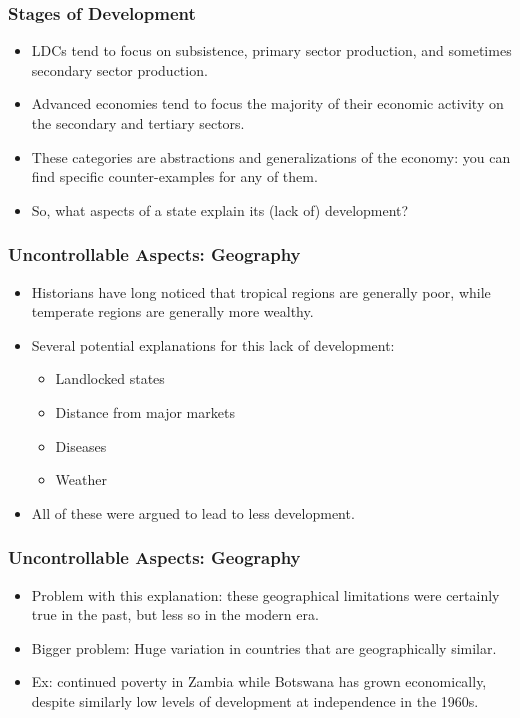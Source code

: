 \documentclass{beamer}
\begin{document}
\begin{frame} 
	\frametitle{\LARGE{Stages of Development}}
	\begin{itemize}
		\item LDCs tend to focus on subsistence, primary sector production, and sometimes secondary sector production. \pause
		\item Advanced economies tend to focus the majority of their economic activity on the secondary and tertiary sectors. \pause
		\item These categories are abstractions and generalizations of the economy: you can find specific counter-examples for any of them.
		\item So, what aspects of a state explain its (lack of) development?
	\end{itemize}
\end{frame}

\begin{frame} 
\frametitle{\LARGE{Uncontrollable Aspects: Geography}}
\begin{itemize}
		\item Historians have long noticed that tropical regions are generally poor, while temperate regions are generally more wealthy. \pause
		\item Several potential explanations for this lack of development:
		\begin{itemize}
			\item Landlocked states \pause
			\item Distance from major markets \pause
			\item Diseases \pause
			\item Weather \pause
		\end{itemize}
		\item All of these were argued to lead to less development. 
\end{itemize}
\end{frame}

\begin{frame} 
	\frametitle{\LARGE{Uncontrollable Aspects: Geography}}
	\begin{itemize}
		\item Problem with this explanation: these geographical limitations were certainly true in the past, but less so in the modern era. \pause
		\item Bigger problem: Huge variation in countries that are geographically similar. \pause
		\item Ex: continued poverty in Zambia while Botswana has grown economically, despite similarly low levels of development at independence in the 1960s.
	\end{itemize}
\end{frame}
\end{document}
